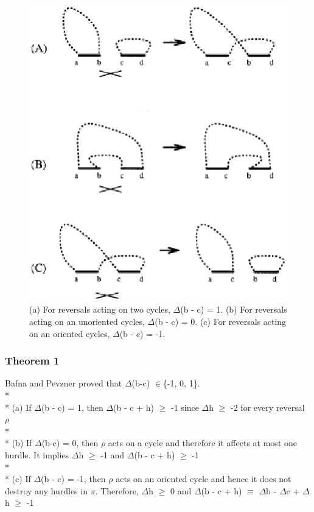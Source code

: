 \documentclass[10pt]{article}
\begin{document}
\begin{figure}[here!]
\includegraphics[scale=0.6]{resources/reversals.eps}
\caption{(a) For reversals acting on two cycles, $\Delta$(b - c) = 1.
(b) For reversals acting on an unoriented cycles, $\Delta$(b - c) = 0.
(c) For reversals acting on an oriented cycles, $\Delta$(b - c) = -1.}
\label{fig:reversals}
\end{figure}

\subsubsection*{Theorem 1}
Bafna and Pevzner proved that $\Delta$(b-c) $\in$\{-1, 0, 1\}. 
\\*
\\*
(a) If $\Delta$(b -
c) = 1, then $\Delta$(b - c + h) $\geq$ -1 since $\Delta$h $\geq$ -2 for every
reversal $\rho$
\\*
\\*
(b) If $\Delta$(b-c) = 0,
then $\rho$ acts on a cycle and therefore it affects at most one hurdle. It
implies $\Delta$h $\geq$ -1 and $\Delta$(b - c + h) $\geq$ -1
\\*
\\*
(c) If $\Delta$(b - c)
= -1, then $\rho$ acts on an oriented cycle and hence it does not destroy any
hurdles in $\pi$. Therefore, $\Delta$h $\geq$ 0 and $\Delta$(b - c + h)
$\equiv$ $\Delta$b - $\Delta$c + $\Delta$h $\geq$ -1
\end{document}
